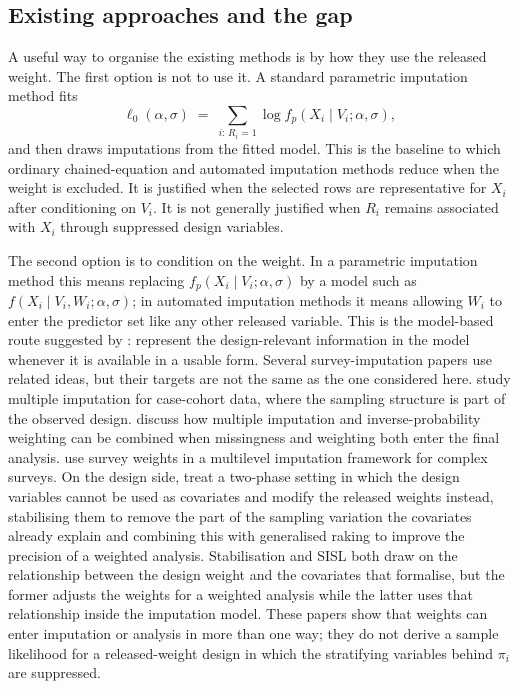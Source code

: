\subsection{Existing approaches and the gap}
\label{sec:SISL_background_gap}
 
A useful way to organise the existing methods is by how they use the released weight. The first option is not to use it. A standard parametric imputation method fits
\begin{equation}
\ell_0(\alpha,\sigma)
\;=\;
\sum_{i:\,R_i = 1} \log f_p(X_i \mid V_i;\alpha,\sigma),
\label{eq:SISL_existing_MI}
\end{equation}
and then draws imputations from the fitted model. This is the baseline to which ordinary chained-equation and automated imputation methods reduce when the weight is excluded. It is justified when the selected rows are representative for $X_i$ after conditioning on $V_i$. It is not generally justified when $R_i$ remains associated with $X_i$ through suppressed design variables.

The second option is to condition on the weight. In a parametric imputation method this means replacing $f_p(X_i\mid V_i;\alpha,\sigma)$ by a model such as $f(X_i\mid V_i,W_i;\alpha,\sigma)$; in automated imputation methods it means allowing $W_i$ to enter the predictor set like any other released variable. This is the model-based route suggested by \citet{gelman2007struggles}: represent the design-relevant information in the model whenever it is available in a usable form. Several survey-imputation papers use related ideas, but their targets are not the same as the one considered here. \citet{marti2011multiple} study multiple imputation for case-cohort data, where the sampling structure is part of the observed design. \citet{seaman2012combining} discuss how multiple imputation and inverse-probability weighting can be combined when missingness and weighting both enter the final analysis. \citet{quartagno2020multiple} use survey weights in a multilevel imputation framework for complex surveys. On the design side, \citet{chen2026generalised} treat a two-phase setting in which the design variables cannot be used as covariates and modify the released weights instead, stabilising them to remove the part of the sampling variation the covariates already explain and combining this with generalised raking to improve the precision of a weighted analysis. Stabilisation and SISL both draw on the relationship between the design weight and the covariates that \citet{pfeffermann1999parametric} formalise, but the former adjusts the weights for a weighted analysis while the latter uses that relationship inside the imputation model. These papers show that weights can enter imputation or analysis in more than one way; they do not derive a sample likelihood for a released-weight design in which the stratifying variables behind $\pi_i$ are suppressed.

